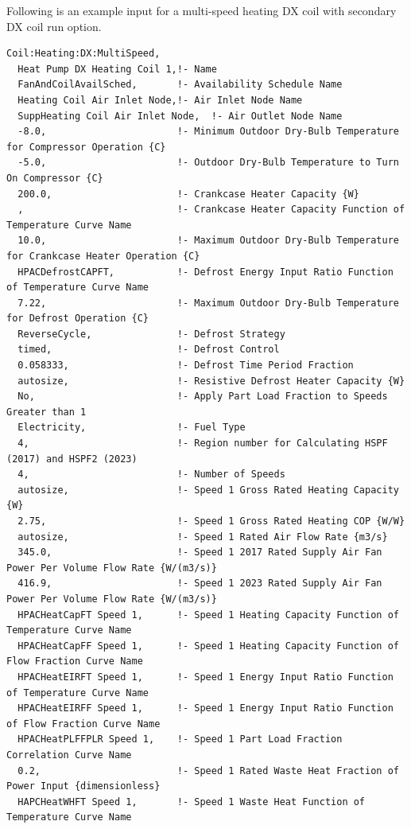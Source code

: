 Following is an example input for a multi-speed heating DX coil with secondary DX coil run option.

\begin{lstlisting}
Coil:Heating:DX:MultiSpeed,
  Heat Pump DX Heating Coil 1,!- Name
  FanAndCoilAvailSched,       !- Availability Schedule Name
  Heating Coil Air Inlet Node,!- Air Inlet Node Name
  SuppHeating Coil Air Inlet Node,  !- Air Outlet Node Name
  -8.0,                       !- Minimum Outdoor Dry-Bulb Temperature for Compressor Operation {C}
  -5.0,                       !- Outdoor Dry-Bulb Temperature to Turn On Compressor {C}
  200.0,                      !- Crankcase Heater Capacity {W}
  ,                           !- Crankcase Heater Capacity Function of Temperature Curve Name
  10.0,                       !- Maximum Outdoor Dry-Bulb Temperature for Crankcase Heater Operation {C}
  HPACDefrostCAPFT,           !- Defrost Energy Input Ratio Function of Temperature Curve Name
  7.22,                       !- Maximum Outdoor Dry-Bulb Temperature for Defrost Operation {C}
  ReverseCycle,               !- Defrost Strategy
  timed,                      !- Defrost Control
  0.058333,                   !- Defrost Time Period Fraction
  autosize,                   !- Resistive Defrost Heater Capacity {W}
  No,                         !- Apply Part Load Fraction to Speeds Greater than 1
  Electricity,                !- Fuel Type
  4,                          !- Region number for Calculating HSPF (2017) and HSPF2 (2023)
  4,                          !- Number of Speeds
  autosize,                   !- Speed 1 Gross Rated Heating Capacity {W}
  2.75,                       !- Speed 1 Gross Rated Heating COP {W/W}
  autosize,                   !- Speed 1 Rated Air Flow Rate {m3/s}
  345.0,                      !- Speed 1 2017 Rated Supply Air Fan Power Per Volume Flow Rate {W/(m3/s)}
  416.9,                      !- Speed 1 2023 Rated Supply Air Fan Power Per Volume Flow Rate {W/(m3/s)}
  HPACHeatCapFT Speed 1,      !- Speed 1 Heating Capacity Function of Temperature Curve Name
  HPACHeatCapFF Speed 1,      !- Speed 1 Heating Capacity Function of Flow Fraction Curve Name
  HPACHeatEIRFT Speed 1,      !- Speed 1 Energy Input Ratio Function of Temperature Curve Name
  HPACHeatEIRFF Speed 1,      !- Speed 1 Energy Input Ratio Function of Flow Fraction Curve Name
  HPACHeatPLFFPLR Speed 1,    !- Speed 1 Part Load Fraction Correlation Curve Name
  0.2,                        !- Speed 1 Rated Waste Heat Fraction of Power Input {dimensionless}
  HAPCHeatWHFT Speed 1,       !- Speed 1 Waste Heat Function of Temperature Curve Name

\end{lstlisting}
